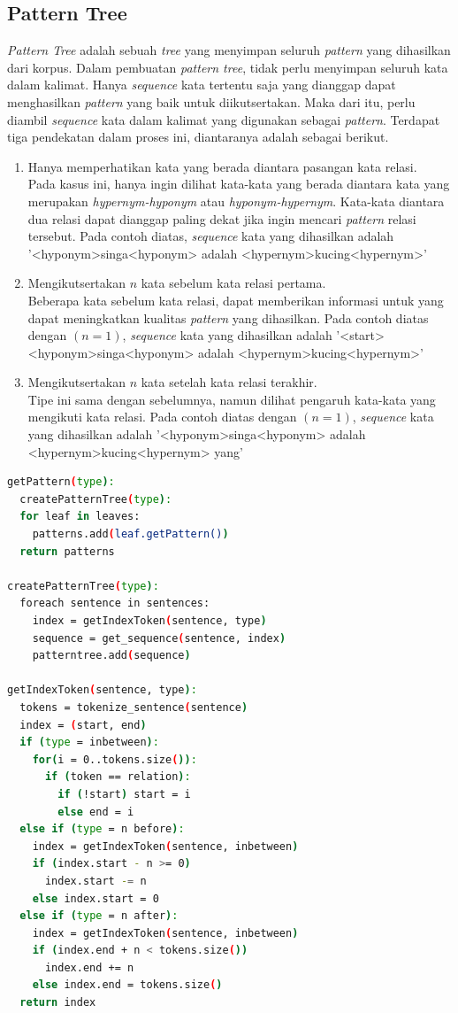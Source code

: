 \subsection{Pattern Tree}
\textit{Pattern Tree} adalah sebuah \textit{tree} yang menyimpan seluruh \textit{pattern} yang dihasilkan dari korpus. Dalam pembuatan \textit{pattern tree}, tidak perlu menyimpan seluruh kata dalam kalimat. Hanya \textit{sequence} kata tertentu saja yang dianggap dapat menghasilkan \textit{pattern} yang baik untuk diikutsertakan. Maka dari itu, perlu diambil \textit{sequence} kata dalam kalimat yang digunakan sebagai \textit{pattern}. Terdapat tiga pendekatan dalam proses ini, diantaranya adalah sebagai berikut.
\begin{enumerate}
  \item Hanya memperhatikan kata yang berada diantara pasangan kata relasi. \\
  Pada kasus ini, hanya ingin dilihat kata-kata yang berada diantara kata yang merupakan \textit{hypernym-hyponym} atau \textit{hyponym-hypernym}. Kata-kata diantara dua relasi dapat dianggap paling dekat jika ingin mencari \textit{pattern} relasi tersebut. Pada contoh diatas, \textit{sequence} kata yang dihasilkan adalah '<hyponym>singa<hyponym> adalah <hypernym>kucing<hypernym>'
  \item Mengikutsertakan $n$ kata sebelum kata relasi pertama. \\
  Beberapa kata sebelum kata relasi, dapat memberikan informasi untuk yang dapat meningkatkan kualitas \textit{pattern} yang dihasilkan. Pada contoh diatas dengan $(n=1)$, \textit{sequence} kata yang dihasilkan adalah '<start> <hyponym>singa<hyponym> adalah <hypernym>kucing<hypernym>'
  \item Mengikutsertakan $n$ kata setelah kata relasi terakhir. \\
  Tipe ini sama dengan sebelumnya, namun dilihat pengaruh kata-kata yang mengikuti kata relasi. Pada contoh diatas dengan $(n=1)$, \textit{sequence} kata yang dihasilkan adalah '<hyponym>singa<hyponym> adalah <hypernym>kucing<hypernym> yang'
\end{enumerate}
\begin{lstlisting}[language=bash]
getPattern(type):
  createPatternTree(type):
  for leaf in leaves:
    patterns.add(leaf.getPattern())
  return patterns

createPatternTree(type):
  foreach sentence in sentences:
    index = getIndexToken(sentence, type)
    sequence = get_sequence(sentence, index)
    patterntree.add(sequence)

getIndexToken(sentence, type):
  tokens = tokenize_sentence(sentence)
  index = (start, end)
  if (type = inbetween):
    for(i = 0..tokens.size()):
      if (token == relation):
        if (!start) start = i
        else end = i
  else if (type = n before):
    index = getIndexToken(sentence, inbetween)
    if (index.start - n >= 0)
      index.start -= n
    else index.start = 0
  else if (type = n after):
    index = getIndexToken(sentence, inbetween)
    if (index.end + n < tokens.size())
      index.end += n
    else index.end = tokens.size()
  return index
\end{lstlisting}
